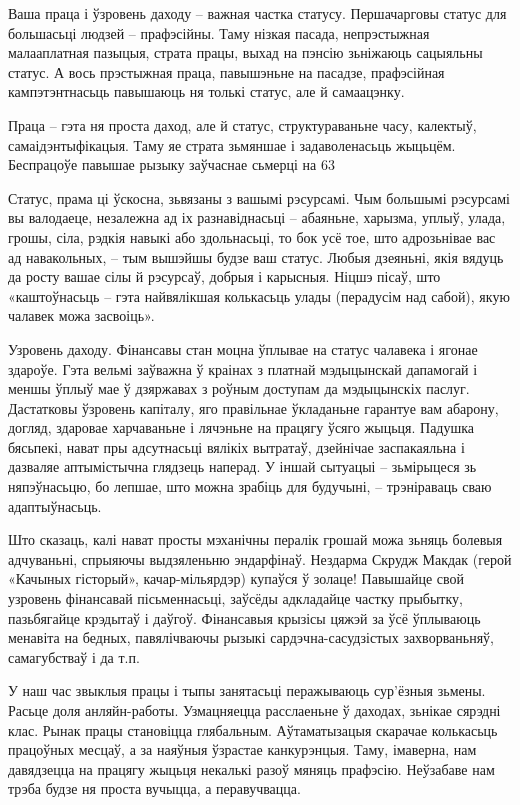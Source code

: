 Ваша праца і ўзровень даходу – важная частка статусу. Першачарговы статус для большасьці людзей – прафэсійны. Таму нізкая пасада, непрэстыжная малааплатная пазыцыя, страта працы, выхад на пэнсію зьніжаюць сацыяльны статус. А вось прэстыжная праца, павышэньне на пасадзе, прафэсійная кампэтэнтнасьць павышаюць ня толькі статус, але й самаацэнку.

Праца – гэта ня проста даход, але й статус, структураваньне часу, калектыў, самаідэнтыфікацыя. Таму яе страта зьмяншае і задаволенасьць жыцьцём. Беспрацоўе павышае рызыку заўчаснае сьмерці на 63%

Статус, прама ці ўскосна, зьвязаны з вашымі рэсурсамі. Чым большымі рэсурсамі вы валодаеце, незалежна ад іх разнавіднасьці – абаяньне, харызма, уплыў, улада, грошы, сіла, рэдкія навыкі або здольнасьці, то бок усё тое, што адрозьнівае вас ад навакольных, – тым вышэйшы будзе ваш статус. Любыя дзеяньні, якія вядуць да росту вашае сілы й рэсурсаў, добрыя і карысныя. Ніцшэ пісаў, што «каштоўнасьць – гэта найвялікшая колькасьць улады (перадусім над сабой), якую чалавек можа засвоіць».

Узровень даходу. Фінансавы стан моцна ўплывае на статус чалавека і ягонае здароўе. Гэта вельмі заўважна ў краінах з платнай мэдыцынскай дапамогай і меншы ўплыў мае ў дзяржавах з роўным доступам да мэдыцынскіх паслуг. Дастатковы ўзровень капіталу, яго правільнае ўкладаньне гарантуе вам абарону, догляд, здаровае харчаваньне і лячэньне на працягу ўсяго жыцьця. Падушка бясьпекі, нават пры адсутнасьці вялікіх вытратаў, дзейнічае заспакаяльна і дазваляе аптымістычна глядзець наперад. У іншай сытуацыі – зьмірыцеся зь няпэўнасьцю, бо лепшае, што можна зрабіць для будучыні, – трэніраваць сваю адаптыўнасьць.

Што сказаць, калі нават просты мэханічны пералік грошай можа зьняць болевыя адчуваньні, спрыяючы выдзяленьню эндарфінаў. Нездарма Скрудж Макдак (герой «Качыных гісторый», качар-мільярдэр) купаўся ў золаце! Павышайце свой узровень фінансавай пісьменнасьці, заўсёды адкладайце частку прыбытку, пазьбягайце крэдытаў і даўгоў. Фінансавыя крызісы цяжэй за ўсё ўплываюць менавіта на бедных, павялічваючы рызыкі сардэчна-сасудзістых захворваньняў, самагубстваў і да т.п.

У наш час звыклыя працы і тыпы занятасьці перажываюць сур'ёзныя зьмены. Расьце доля анляйн-работы. Узмацняецца расслаеньне ў даходах, зьнікае сярэдні клас. Рынак працы становіцца глябальным. Аўтаматызацыя скарачае колькасьць працоўных месцаў, а за наяўныя ўзрастае канкурэнцыя. Таму, імаверна, нам давядзецца на працягу жыцьця некалькі разоў мяняць прафэсію. Неўзабаве нам трэба будзе ня проста вучыцца, а перавучвацца.

